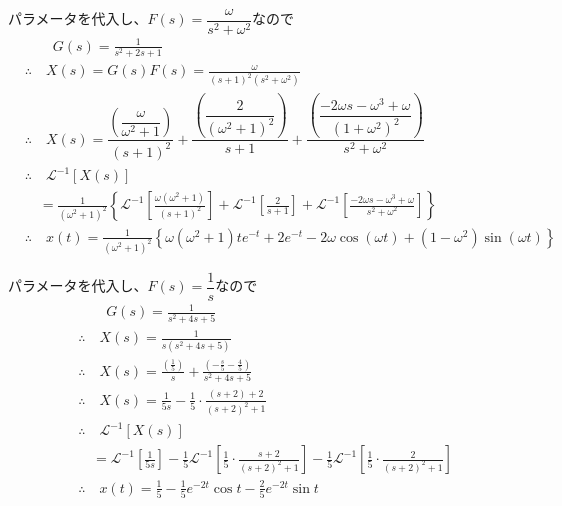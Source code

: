 \documentclass[a4paper,12pt]{article}
\begin{document}
\begin{tcolorbox}[title={4. (7) \(M=1,D=2,K=1,\)入力を\(f(t)=\sin \omega t\)として、応答\(x(t)\)を求めよ。}]
    パラメータを代入し、\(F(s) = \dfrac{\omega}{s^2 + \omega^2}\)なので
    \vspace{-2mm}
    \begin{align*}
        &\qquad G(s) = \frac{1}{s^2 + 2s + 1} \\
        &\therefore \quad X(s) = G(s) F(s) = \frac{\omega}{(s+1)^2(s^2 + \omega^2)} \\
        &\therefore \quad X(s) 
        = \dfrac{\left(\dfrac{\omega}{\omega^2 + 1}\right)}{(s+1)^2}
        + \dfrac{\left(\dfrac{2}{(\omega^2 + 1)^2}\right)}{s+1}
        + \dfrac{\left(\dfrac{-2 \omega s - \omega^3 + \omega}{(1+\omega^2)^2}\right)}{s^2+\omega^2} \\
        &\therefore \quad \mathcal{L}^{-1} \left[ X(s)\right]\\ 
        & \quad = \frac{1}{(\omega^2 + 1)^2} \left\{ \mathcal{L}^{-1} \left[\frac{\omega(\omega^2 + 1)}{(s+1)^2}\right]
        + \mathcal{L}^{-1} \left[\frac{2}{s+1}\right]
        + \mathcal{L}^{-1} \left[\frac{-2 \omega s-\omega ^3+\omega}{s^2+\omega^2}\right] 
        \right\}\\
        &\therefore \quad x(t) =\frac{1}{(\omega^2 + 1)^2}
        \left\{\omega (\omega^2+1)  t e^{-t}+ 2 e^{-t}
        - 2\omega \cos(\omega t) + (1 - \omega^2)  \sin(\omega t) 
        \right\}
    \end{align*}
\end{tcolorbox}

\begin{tcolorbox}[title={4. (8) \(M=1,D=4,K=5\)としてステップ入力を与えたときの応答\(x(t)\)を求めよ。}]
    パラメータを代入し、\(F(s) = \dfrac{1}{s}\)なので
    \vspace{-2mm}
  \begin{align*}
    &\qquad G(s) = \frac{1}{s^2 + 4s + 5} \\
    &\therefore\quad X(s) = \frac{1}{s(s^2 + 4s + 5)} \\
    &\therefore\quad X(s) = \frac{\left(\frac{1}{5}\right)}{s} 
    + \frac{\left(-\frac{s}{5}-\frac{4}{5}\right)}{s^2 + 4s + 5} \\
    &\therefore\quad X(s) = \frac{1}{5s} - \frac{1}{5} \cdot \frac{(s + 2) + 2}{(s + 2)^2 + 1} \\
    &\therefore \quad \mathcal{L}^{-1} \left[ X(s)\right] \\
    &\quad = \mathcal{L}^{-1} \left[\frac{1}{5s}\right] 
    - \frac{1}{5} \mathcal{L}^{-1} \left[\frac{1}{5} \cdot \frac{s + 2}{(s + 2)^2 + 1}\right]
    - \frac{1}{5} \mathcal{L}^{-1} \left[\frac{1}{5} \cdot \frac{2}{(s + 2)^2 + 1} \right] \\
    &\therefore\quad x(t) = \frac{1}{5} - \frac{1}{5} e^{-2t} \cos t - \frac{2}{5} e^{-2t} \sin t
\end{align*}
\end{tcolorbox}
\end{document}
